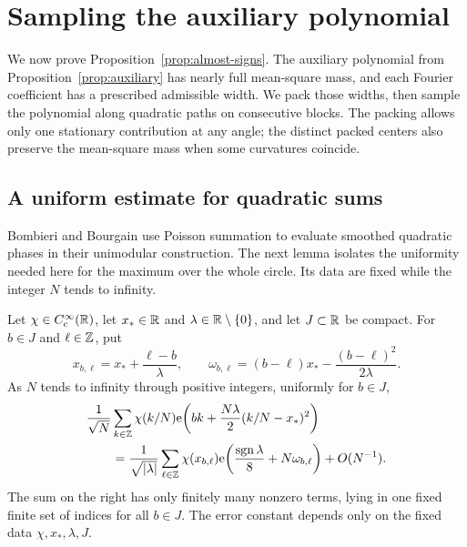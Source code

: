 \section{Sampling the auxiliary polynomial}\label{sec:sampling}

We now prove Proposition~\ref{prop:almost-signs}.  The auxiliary polynomial
from Proposition~\ref{prop:auxiliary} has nearly full mean-square mass, and
each Fourier coefficient has a prescribed admissible width.  We pack those
widths, then sample the polynomial along quadratic paths on consecutive
blocks.  The packing allows only one stationary contribution at any angle;
the distinct packed centers also preserve the mean-square mass when some
curvatures coincide.

\subsection{A uniform estimate for quadratic sums}

Bombieri and Bourgain \cite[Section~7]{BombieriBourgain2009} use Poisson
summation to evaluate smoothed quadratic phases in their unimodular
construction.  The next lemma isolates the uniformity needed here for
the maximum over the whole circle.  Its data are fixed while the integer
$N$ tends to infinity.

\begin{lemma}\label{lem:sampling-poisson}
Let $\chi\in C_c^\infty(\mathbb R)$, let $x_*\in\mathbb R$ and
$\lambda\in\mathbb R\setminus\{0\}$, and let $J\subset\mathbb R$ be compact.
For $b\in J$ and $\ell\in\mathbb Z$, put
\[
 x_{b,\ell}=x_*+\frac{\ell-b}{\lambda},
 \qquad
 \omega_{b,\ell}=(b-\ell)x_*
                  -\frac{(b-\ell)^2}{2\lambda}.
\]
As $N$ tends to infinity through positive integers, uniformly for $b\in J$,
\begin{align}
 &\frac1{\sqrt N}\sum_{k\in\mathbb Z}\chi(k/N)
   \mathrm e\!\left(bk+\frac{N\lambda}{2}(k/N-x_*)^2\right)
 \notag\\
 &\qquad=
 \frac1{\sqrt{|\lambda|}}
 \sum_{\ell\in\mathbb Z}\chi(x_{b,\ell})
 \mathrm e\!\left(\frac{\operatorname{sgn}\lambda}{8}
                      +N\omega_{b,\ell}\right)
 +O(N^{-1}).\label{eq:sampling-poisson}
\end{align}
The sum on the right has only finitely many nonzero terms, lying in one
fixed finite set of indices for all $b\in J$.  The error constant depends
only on the fixed data $\chi,x_*,\lambda,J$.
\end{lemma}

